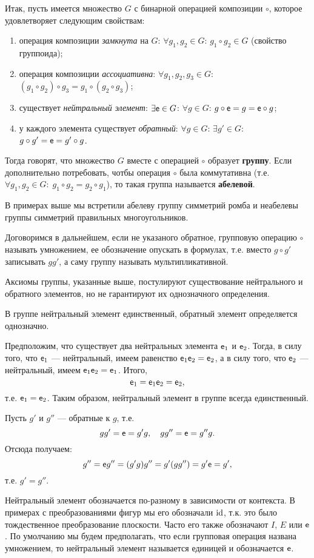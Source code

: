 Итак, пусть имеется множество $G$ с бинарной операцией композиции $\circ$, которое удовлетворяет следующим свойствам:
\begin{enumerate}[G1]
\item операция композиции \textit{замкнута} на $G$: $\forall g_1,g_2\in G$: $g_1\circ g_2\in G$ (свойство группоида);
\item операция композиции \textit{ассоциативна}: $\forall g_1,g_2,g_3\in G$: $(g_1\circ g_2)\circ g_3=g_1\circ (g_2\circ g_3)$;
\item существует \textit{нейтральный элемент}: $\exists\mathsf e\in G$: $\forall g\in G$: $g\circ\mathsf e=g=\mathsf e\circ g$;
\item у каждого элемента существует \textit{обратный}: $\forall g\in G$: $\exists g'\in G$: $g\circ g'=\mathsf e=g'\circ g$.
\end{enumerate}
Тогда говорят, что множество $G$ вместе с операцией $\circ$ образует \textbf{группу}. Если дополнительно потребовать, чотбы операция $\circ$ была коммутативна (т.е. $\forall g_1,g_2\in G:\;g_1\circ g_2=g_2\circ g_1$), то такая группа называется \textbf{абелевой}.

В примерах выше мы встретили абелеву группу симметрий ромба и неабелевы группы симметрий правильных многоугольников.

Договоримся в дальнейшем, если не указаного обратное, групповую операцию $\circ$ называть умножением, ее обозначение опускать в формулах, т.е. вместо $g\circ g'$ записывать $gg'$, а саму группу называть мультипликативной.

Аксиомы группы, указанные выше, постулируют существование нейтрального и обратного элементов, но не гарантируют их однозначного определения.
\begin{thrm}
В группе нейтральный элемент единственный, обратный элемент определяется однозначно.
\end{thrm}
\pf
Предположим, что существует два нейтральных элемента $\mathsf e_1$ и $\mathsf e_2$. Тогда, в силу того, что $\mathsf e_1$ --- нейтральный, имеем равенство $\mathsf e_1\mathsf e_2=\mathsf e_2$, а в силу того, что $\mathsf e_2$ --- нейтральный, имеем $\mathsf e_1\mathsf e_2=\mathsf e_1$. Итого,
$$
\mathsf e_1 = \mathsf e_1\mathsf e_2 = \mathsf e_2,
$$
т.е. $\mathsf e_1=\mathsf e_2$. Таким образом, нейтральный элемент в группе всегда единственный.

Пусть $g'$ и $g''$ --- обратные к $g$, т.е.
$$
gg'=\mathsf e=g'g,\quad gg''=\mathsf e=g''g.
$$
Отсюда получаем:
$$
g''=\mathsf e g''=(g'g)g''=g'(gg'')=g'\mathsf e=g',
$$
т.е. $g'=g''$.
\epf

Нейтральный элемент обозначается по-разному в зависимости от контекста. В примерах с преобразованиями фигур мы его обозначали $\mathrm{id}$, т.к. это было тождественное преобразование плоскости. Часто его также обозначают $I$, $E$ или $\mathsf e$. По умолчанию мы будем предполагать, что если групповая операция названа умножением, то нейтральный элемент называется единицей и обозначается $\mathsf e$.

